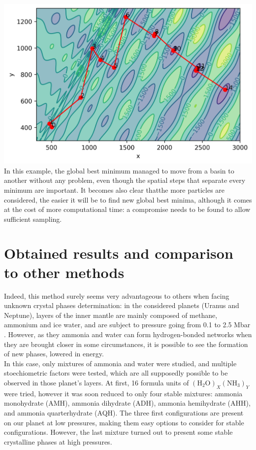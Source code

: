 \documentclass[11pt]{article}
\begin{document}
\begin{multicols}{2}
\noindent\includegraphics[width=\columnwidth]{figures/eggholder.png} \medskip 
In this example, the global best minimum managed to move from a basin to another without any problem, even though the spatial steps that separate every minimum are important. It becomes also clear thatthe more particles are considered, the easier it will be to find new global best minima, although it comes at the cost of more computational time: a compromise needs to be found to allow sufficient sampling.
\section*{Obtained results and comparison to other methods}
Indeed, this method surely seems very advantageous to others when facing unknown crystal phases determination: in the considered planets (Uranus and Neptune), layers of the inner mantle are mainly composed of methane, ammonium and ice water, and are subject to pressure going from 0.1 to 2.5 Mbar \cite{https://doi.org/10.1029/JB085iB01p00225}. However, as they ammonia and water can form hydrogen-bonded networks when they are brought closer in some circumstances, it is possible to see the formation of new phases, lowered in energy.\\
In this case, only mixtures of ammonia and water were studied, and multiple stoechiometric factors were tested, which are all supposedly possible to be observed in those planet's layers. At first, 16 formula units of $( \mathrm{H}_2\mathrm{O})_{X}(\mathrm{N}\mathrm{H}_3)_{Y}$ were tried, however it was soon reduced to only four stable mixtures: ammonia monohydrate (AMH), ammonia dihydrate (ADH), ammonia hemihydrate (AHH), and ammonia quarterhydrate (AQH). The three first configurations are present on our planet at low pressures, making them easy options to consider for stable configurations. However, the last mixture turned out to present some stable crystalline phases at high pressures.\vspace{1em}


\end{multicols}
\end{document}
